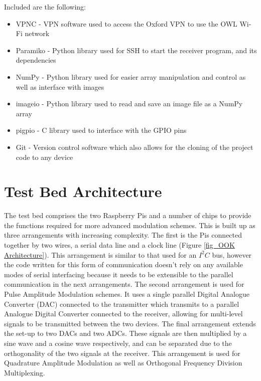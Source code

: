 \documentclass[../main.tex]{subfiles}
\begin{document}
Included are the following:

\begin{itemize}
	\item VPNC - VPN software used to access the Oxford VPN to use the OWL Wi-Fi network
	\item Paramiko - Python library used for SSH to start the receiver program, and its dependencies
	\item NumPy - Python library used for easier array manipulation and control as well as interface with images
	\item imageio - Python library used to read and save an image file as a NumPy array
	\item pigpio - C library used to interface with the GPIO pins
	\item Git - Version control software which also allows for the cloning of the project code to any device
\end{itemize}

	
\section{Test Bed Architecture}

The test bed comprises the two Raspberry Pis and a number of chips to provide the functions required for more advanced modulation schemes.
This is built up as three arrangements with increasing complexity.
The first is the Pis connected together by two wires, a serial data line and a clock line (Figure \ref{fig_OOK Architecture}).
This arrangement is similar to that used for an $I^2C$ bus, however the code written for this form of communication doesn't rely on any available modes of serial interfacing because it needs to be extensible to the parallel communication in the next arrangements.
The second arrangement is used for Pulse Amplitude Modulation schemes.
It uses a single parallel Digital Analogue Converter (DAC) connected to the transmitter which transmits to a parallel Analogue Digital Converter connected to the receiver, allowing for multi-level signals to be transmitted between the two devices.
The final arrangement extends the set-up to two DACs and two ADCs.
These signals are then multiplied by a sine wave and a cosine wave respectively, and can be separated due to the orthogonality of the two signals at the receiver.
This arrangement is used for Quadrature Amplitude Modulation as well as Orthogonal Frequency Division Multiplexing.\\
\end{document}
